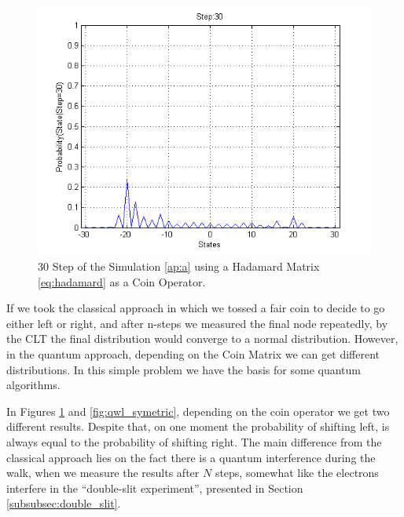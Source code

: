 \begin{figure}[h]
\centering 
\includegraphics[scale=0.50]{Figures/quantum_walk_line_hadamard.png}
\caption{30 Step of the Simulation \ref{ap:a} using a Hadamard Matrix \ref{eq:hadamard} as a Coin Operator.}
\label{fig:qwl_hadamard}
\end{figure}

If we took the classical approach in which we tossed a fair coin to decide to go either left or right, and after n-steps we measured the final node repeatedly, by the \ac{CLT} the final distribution would converge to a normal distribution. However, in the quantum approach, depending on the Coin Matrix we can get different distributions. In this simple problem we have the basis for some quantum algorithms. 

In Figures \ref{fig:qwl_hadamard} and \ref{fig:qwl_symetric}, depending on the coin operator we get two different results. Despite that, on one moment the  probability of shifting left, is always equal to the probability of shifting right. The main difference from the classical approach  lies on the fact there is a quantum interference during the walk, when we measure the results after $N$ steps, somewhat like the electrons interfere in the ``double-slit experiment'', presented in Section \ref{subsubsec:double_slit}. 


